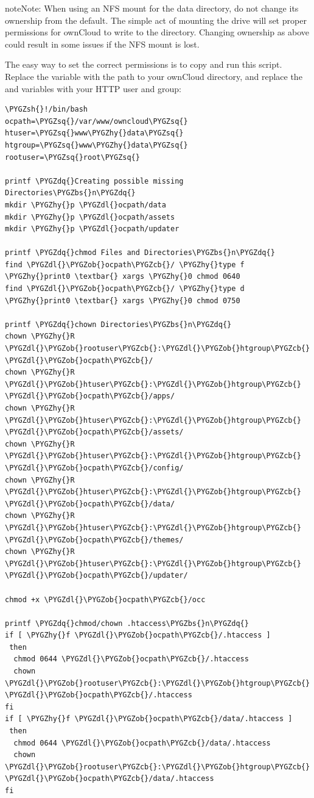 \documentclass[letterpaper,10pt,english]{sphinxmanual}
\def\PYGZbs{\char`\\}
\def\PYGZob{\char`\{}
\def\PYGZcb{\char`\}}
\def\PYGZsh{\char`\#}
\def\PYGZdl{\char`\$}
\def\PYGZhy{\char`\-}
\def\PYGZsq{\char`\'}
\def\PYGZdq{\char`\"}
\begin{document}
\begin{notice}{note}{Note:}
When using an NFS mount for the data directory, do not change its
ownership from the default. The simple act of mounting the drive will set
proper permissions for ownCloud to write to the directory. Changing
ownership as above could result in some issues if the NFS mount is
lost.
\end{notice}

The easy way to set the correct permissions is to copy and run this script.
Replace the  variable with the path to your ownCloud directory, and
replace the  and  variables with your HTTP user and group:

\begin{Verbatim}[commandchars=\\\{\}]
\PYGZsh{}!/bin/bash
ocpath=\PYGZsq{}/var/www/owncloud\PYGZsq{}
htuser=\PYGZsq{}www\PYGZhy{}data\PYGZsq{}
htgroup=\PYGZsq{}www\PYGZhy{}data\PYGZsq{}
rootuser=\PYGZsq{}root\PYGZsq{}

printf \PYGZdq{}Creating possible missing Directories\PYGZbs{}n\PYGZdq{}
mkdir \PYGZhy{}p \PYGZdl{}ocpath/data
mkdir \PYGZhy{}p \PYGZdl{}ocpath/assets
mkdir \PYGZhy{}p \PYGZdl{}ocpath/updater

printf \PYGZdq{}chmod Files and Directories\PYGZbs{}n\PYGZdq{}
find \PYGZdl{}\PYGZob{}ocpath\PYGZcb{}/ \PYGZhy{}type f \PYGZhy{}print0 \textbar{} xargs \PYGZhy{}0 chmod 0640
find \PYGZdl{}\PYGZob{}ocpath\PYGZcb{}/ \PYGZhy{}type d \PYGZhy{}print0 \textbar{} xargs \PYGZhy{}0 chmod 0750

printf \PYGZdq{}chown Directories\PYGZbs{}n\PYGZdq{}
chown \PYGZhy{}R \PYGZdl{}\PYGZob{}rootuser\PYGZcb{}:\PYGZdl{}\PYGZob{}htgroup\PYGZcb{} \PYGZdl{}\PYGZob{}ocpath\PYGZcb{}/
chown \PYGZhy{}R \PYGZdl{}\PYGZob{}htuser\PYGZcb{}:\PYGZdl{}\PYGZob{}htgroup\PYGZcb{} \PYGZdl{}\PYGZob{}ocpath\PYGZcb{}/apps/
chown \PYGZhy{}R \PYGZdl{}\PYGZob{}htuser\PYGZcb{}:\PYGZdl{}\PYGZob{}htgroup\PYGZcb{} \PYGZdl{}\PYGZob{}ocpath\PYGZcb{}/assets/
chown \PYGZhy{}R \PYGZdl{}\PYGZob{}htuser\PYGZcb{}:\PYGZdl{}\PYGZob{}htgroup\PYGZcb{} \PYGZdl{}\PYGZob{}ocpath\PYGZcb{}/config/
chown \PYGZhy{}R \PYGZdl{}\PYGZob{}htuser\PYGZcb{}:\PYGZdl{}\PYGZob{}htgroup\PYGZcb{} \PYGZdl{}\PYGZob{}ocpath\PYGZcb{}/data/
chown \PYGZhy{}R \PYGZdl{}\PYGZob{}htuser\PYGZcb{}:\PYGZdl{}\PYGZob{}htgroup\PYGZcb{} \PYGZdl{}\PYGZob{}ocpath\PYGZcb{}/themes/
chown \PYGZhy{}R \PYGZdl{}\PYGZob{}htuser\PYGZcb{}:\PYGZdl{}\PYGZob{}htgroup\PYGZcb{} \PYGZdl{}\PYGZob{}ocpath\PYGZcb{}/updater/

chmod +x \PYGZdl{}\PYGZob{}ocpath\PYGZcb{}/occ

printf \PYGZdq{}chmod/chown .htaccess\PYGZbs{}n\PYGZdq{}
if [ \PYGZhy{}f \PYGZdl{}\PYGZob{}ocpath\PYGZcb{}/.htaccess ]
 then
  chmod 0644 \PYGZdl{}\PYGZob{}ocpath\PYGZcb{}/.htaccess
  chown \PYGZdl{}\PYGZob{}rootuser\PYGZcb{}:\PYGZdl{}\PYGZob{}htgroup\PYGZcb{} \PYGZdl{}\PYGZob{}ocpath\PYGZcb{}/.htaccess
fi
if [ \PYGZhy{}f \PYGZdl{}\PYGZob{}ocpath\PYGZcb{}/data/.htaccess ]
 then
  chmod 0644 \PYGZdl{}\PYGZob{}ocpath\PYGZcb{}/data/.htaccess
  chown \PYGZdl{}\PYGZob{}rootuser\PYGZcb{}:\PYGZdl{}\PYGZob{}htgroup\PYGZcb{} \PYGZdl{}\PYGZob{}ocpath\PYGZcb{}/data/.htaccess
fi
\end{Verbatim}
\end{document}
